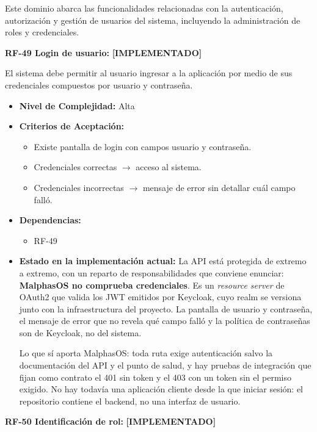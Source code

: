 \documentclass[12pt,a4paper]{article}
\newcommand{\estadoImplementado}{\textcolor{mainRed}{\textbf{[IMPLEMENTADO]}}}
\begin{document}
Este dominio abarca las funcionalidades relacionadas con la autenticación, autorización y gestión de usuarios del sistema, incluyendo la administración de roles y credenciales.

\textbf{RF-49 Login de usuario:} \estadoImplementado{}

El sistema debe permitir al usuario ingresar a la aplicación por medio de sus credenciales compuestos por usuario y contraseña.

\begin{itemize}
  \item \textbf{Nivel de Complejidad:} Alta

  \item \textbf{Criterios de Aceptación:}
  \begin{itemize}
    \item Existe pantalla de login con campos usuario y contraseña.
    \item Credenciales correctas $\rightarrow$ acceso al sistema.
    \item Credenciales incorrectas $\rightarrow$ mensaje de error sin detallar cuál campo falló.
  \end{itemize}

  \item \textbf{Dependencias:}
  \begin{itemize}
    \item RF-49
  \end{itemize}

  \item \textbf{Estado en la implementación actual:} La API está protegida de extremo a extremo, con un reparto de responsabilidades que conviene enunciar: \textbf{MalphasOS no comprueba credenciales}. Es un \emph{resource server} de OAuth2 que valida los JWT emitidos por Keycloak, cuyo realm se versiona junto con la infraestructura del proyecto. La pantalla de usuario y contraseña, el mensaje de error que no revela qué campo falló y la política de contraseñas son de Keycloak, no del sistema.

  Lo que sí aporta MalphasOS: toda ruta exige autenticación salvo la documentación del API y el punto de salud, y hay pruebas de integración que fijan como contrato el 401 sin token y el 403 con un token sin el permiso exigido. No hay todavía una aplicación cliente desde la que iniciar sesión: el repositorio contiene el backend, no una interfaz de usuario.
\end{itemize}

\textbf{RF-50 Identificación de rol:} \estadoImplementado{}
\end{document}

